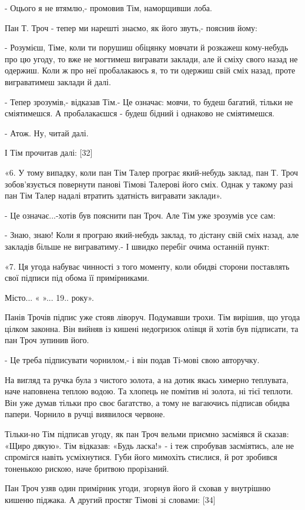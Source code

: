- Оцього я не втямлю,- промовив Тім, наморщивши лоба.

Пан Т. Троч - тепер ми нарешті знаємо, як його звуть,- пояснив йому:

- Розумієш, Тіме, коли ти порушиш обіцянку мовчати й розкажеш кому-небудь про цю угоду, то вже не могтимеш вигравати заклади, але й сміху свого назад не одержиш. Коли ж про неї пробалакаюсь я, то ти одержиш свій сміх назад, проте виграватимеш заклади й далі.

- Тепер зрозумів,- відказав Тім.- Це означає: мовчи, то будеш багатий, тільки не сміятимешся. А пробалакаєшся - будеш бідний і однаково не сміятимешся.

- Атож. Ну, читай далі.

І Тім прочитав далі: [32]

«6. У тому випадку, коли пан Тім Талер програє який-небудь заклад, пан Т. Троч зобов'язується повернути панові Тімові Талерові його сміх. Однак у такому разі пан Тім Талер надалі втратить здатність вигравати заклади».

- Це означає...-хотів був пояснити пан Троч. Але Тім уже зрозумів усе сам:

- Знаю, знаю! Коли я програю який-небудь заклад, то дістану свій сміх назад, але закладів більше не виграватиму.- І швидко перебіг очима останній пункт:

«7. Ця угода набуває чинності з того моменту, коли обидві сторони поставлять свої підписи під обома її примірниками.

Місто... « »... 19.. року».

Панів Трочів підпис уже стояв ліворуч. Подумавши трохи. Тім вирішив, що угода цілком законна. Він вийняв із кишені недогризок олівця й хотів був підписати, та пан Троч зупинив його.

- Це треба підписувати чорнилом,- і він подав Ті-мові свою авторучку.

На вигляд та ручка була з чистого золота, а на дотик якась химерно теплувата, наче наповнена теплою водою. Та хлопець не помітив ні золота, ні тієї теплоти. Він уже думав тільки про своє багатство, а тому не вагаючись підписав обидва папери. Чорнило в ручці виявилося червоне.

Тільки-но Тім підписав угоду, як пан Троч вельми приємно засміявся й сказав: «Щиро дякую». Тім відказав: «Будь ласка!» - і теж спробував засміятись, але не спромігся навіть усміхнутися. Губи його мимохіть стислися, й рот зробився тоненькою рискою, наче бритвою прорізаний.

Пан Троч узяв один примірник угоди, згорнув його й сховав у внутрішню кишеню піджака. А другий простяг Тімові зі словами: [34]

